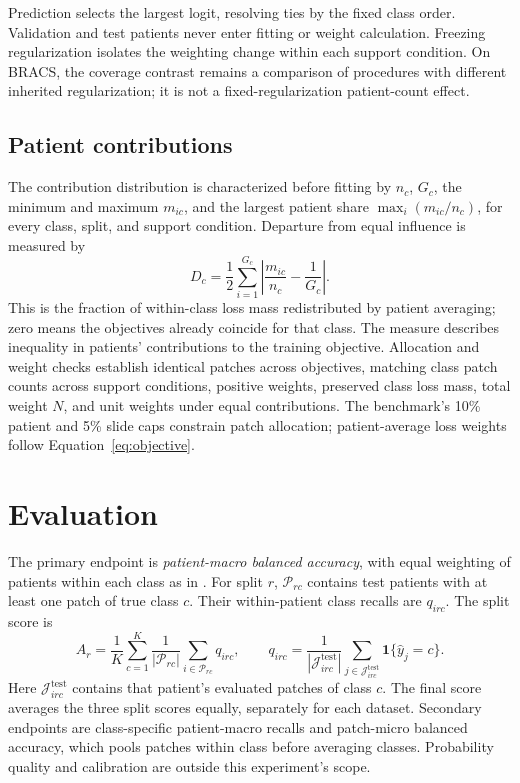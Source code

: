 \documentclass[11pt]{article}
\begin{document}
\noindent Prediction selects the largest logit, resolving ties by the fixed class order. Validation and test patients never enter fitting or weight calculation. Freezing regularization isolates the weighting change within each support condition. On BRACS, the coverage contrast remains a comparison of procedures with different inherited regularization; it is not a fixed-regularization patient-count effect.

\subsection{Patient contributions}
The contribution distribution is characterized before fitting by \(n_c\), \(G_c\), the minimum and maximum \(m_{ic}\), and the largest patient share \(\max_i(m_{ic}/n_c)\), for every class, split, and support condition. Departure from equal influence is measured by
\begin{equation}
 D_c=\frac12\sum_{i=1}^{G_c}\left|\frac{m_{ic}}{n_c}-\frac1{G_c}\right|.
 \label{eq:influence}
\end{equation}
\noindent This is the fraction of within-class loss mass redistributed by patient averaging; zero means the objectives already coincide for that class. The measure describes inequality in patients' contributions to the training objective. Allocation and weight checks establish identical patches across objectives, matching class patch counts across support conditions, positive weights, preserved class loss mass, total weight \(N\), and unit weights under equal contributions. The benchmark's 10\% patient and 5\% slide caps constrain patch allocation; patient-average loss weights follow Equation~\eqref{eq:objective}.

\section{Evaluation}
\label{sec:evaluation}
The primary endpoint is \emph{patient-macro balanced accuracy}, with equal weighting of patients within each class as in \citet{queisler2026patientShortage}. For split \(r\), \(\mathcal P_{rc}\) contains test patients with at least one patch of true class \(c\). Their within-patient class recalls are \(q_{irc}\). The split score is
\begin{equation}
 A_r=\frac1K\sum_{c=1}^{K}\frac1{|\mathcal P_{rc}|}
 \sum_{i\in\mathcal P_{rc}}q_{irc},
 \qquad
 q_{irc}=\frac1{|\mathcal J^{\mathrm{test}}_{irc}|}
 \sum_{j\in\mathcal J^{\mathrm{test}}_{irc}}\mathbf1\{\widehat y_j=c\}.
 \label{eq:accuracy}
\end{equation}
\noindent Here \(\mathcal J^{\mathrm{test}}_{irc}\) contains that patient's evaluated patches of class \(c\). The final score averages the three split scores equally, separately for each dataset. Secondary endpoints are class-specific patient-macro recalls and patch-micro balanced accuracy, which pools patches within class before averaging classes. Probability quality and calibration are outside this experiment's scope.
\end{document}
